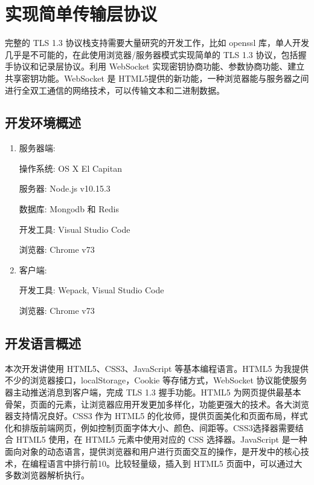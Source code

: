 \section{实现简单传输层协议}

  完整的 TLS 1.3 协议栈支持需要大量研究的开发工作，比如 openssl 库，单人开发几乎是不可能的，在此使用浏览器/服务器模式实现简单的 TLS 1.3 协议，包括握手协议和记录层协议\cite{7958593}。利用 WebSocket 实现密钥协商功能、参数协商功能、建立共享密钥功能。WebSocket 是 HTML5提供的新功能，一种浏览器能与服务器之间进行全双工通信的网络技术，可以传输文本和二进制数据。

  \subsection{开发环境概述}

  \begin{enumerate}
    \item 服务器端:
    
      操作系统: OS X El Capitan

      服务器: Node.js v10.15.3

      数据库: Mongodb 和 Redis

      开发工具: Visual Studio Code

      浏览器: Chrome v73

    \item 客户端:

      开发工具: Wepack, Visual Studio Code

      浏览器: Chrome v73

  \end{enumerate}

  \subsection{开发语言概述}

    本次开发讲使用 HTML5、CSS3、JavaScript 等基本编程语言。HTML5 为我提供不少的浏览器接口，localStorage，Cookie 等存储方式，WebSocket 协议能使服务器主动推送消息到客户端，完成 TLS 1.3 握手功能。HTML5 为网页提供最基本骨架，页面的元素，让浏览器应用开发更加多样化，功能更强大的技术。各大浏览器支持情况良好。CSS3 作为 HTML5 的化妆师，提供页面美化和页面布局，样式化和排版前端网页，例如控制页面字体大小、颜色、间距等。CSS3选择器需要结合 HTML5 使用，在 HTML5 元素中使用对应的 CSS 选择器。JavaScript 是一种面向对象的动态语言，提供浏览器和用户进行页面交互的操作，是开发中的核心技术，在编程语言中排行前10。比较轻量级，插入到 HTML5 页面中，可以通过大多数浏览器解析执行。

